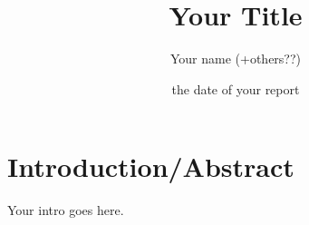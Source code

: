 \documentclass[10pt]{report}
\title{\Huge\bfseries{Your Title}}
\author{Your name (+others??)}
\date{the date of your report}
\begin{document}
\maketitle

\chapter*{Introduction/Abstract}

\large{
  Your intro goes here.
}

\newpage

\tableofcontents

\normalsize


\newpage


\newpage

\end{document}
